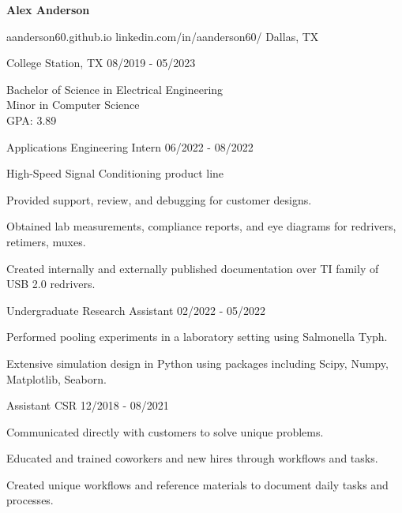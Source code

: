 \documentclass[11pt]{article}
\begin{document}
\centerline{{\Huge \bf Alex Anderson}}

\bigskip

        {aanderson60.github.io}
        {linkedin.com/in/aanderson60/}
        {Dallas, TX}


\begin{description}
\squish
{}
            {College Station, TX}
            {08/2019 - 05/2023}

Bachelor of Science in Electrical Engineering\\
Minor in Computer Science\\
GPA: 3.89 

\end{description}


\begin{description}
      \squish
                 {Applications Engineering Intern}
                 {06/2022 - 08/2022}
      
      High-Speed Signal Conditioning product line
      
      Provided support, review, and debugging for customer designs. 

      Obtained lab measurements, compliance reports, and eye diagrams for redrivers, retimers, muxes.
      
      Created internally and externally published documentation over TI family of USB 2.0 redrivers.
      
\end{description}

\begin{description}
\squish
{}
           {Undergraduate Research Assistant}
           {02/2022 - 05/2022} 

Performed pooling experiments in a laboratory setting using Salmonella Typh.

Extensive simulation design in Python using packages including Scipy, Numpy, Matplotlib, Seaborn.

\end{description}

\begin{description}
\squish
{}
           {Assistant CSR}
           {12/2018 - 08/2021}

Communicated directly with customers to solve unique problems.

Educated and trained coworkers and new hires through workflows and tasks.

Created unique workflows and reference materials to document daily tasks and processes.

\end{description}
\end{document}
